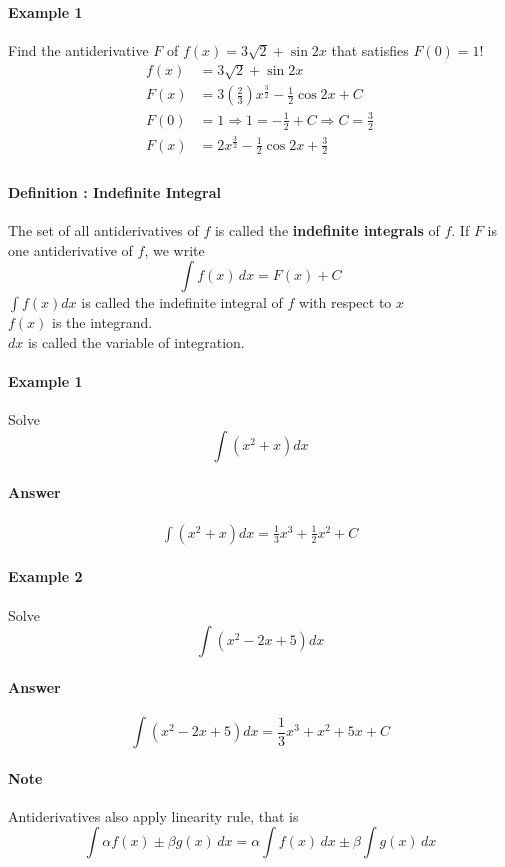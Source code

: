 \documentclass[12pt]{article}
\begin{document}
\paragraph{Example 1} Find the antiderivative $F$ of $f(x) = 3 \sqrt{2} + \sin 2x$ that satisfies $F(0) = 1$!
\begin{align*} 
    f(x) &= 3 \sqrt{2} + \sin 2x \\
    F(x) &= 3(\frac{2}{3}) x^{\frac{3}{2}} - \frac{1}{2} \cos 2x + C \\
    F(0) &= 1 \Rightarrow 1 = - \frac{1}{2} + C \Rightarrow C = \frac{3}{2} \\
    F(x) &= 2 x^{\frac{3}{2}} - \frac{1}{2} \cos 2x + \frac{3}{2} \\
\end{align*}

\paragraph{Definition : Indefinite Integral}
The set of all antiderivatives of $f$ is called the \textbf{indefinite integrals} of $f$. 
If $F$ is one antiderivative of $f$, we write
\[
    \int f(x) \, dx = F(x) + C
\]
\noindent
$\int f(x) dx$ is called the indefinite integral of $f$ with respect to $x$ \\
$f(x)$ is the integrand. \\
$dx$ is called the variable of integration.

\paragraph{Example 1} Solve
\[
    \int (x^2 + x) dx
\]
\paragraph{Answer}
\begin{align*} 
    \int (x^2 + x) dx = \frac{1}{3}x^3 + \frac{1}{2}x^2 + C
\end{align*}
\paragraph{Example 2} Solve
\[
    \int (x^2 - 2x + 5) dx 
\]
\paragraph{Answer}
\[
    \int (x^2 - 2x + 5) dx =  \frac{1}{3}x^3 + x^2 + 5x +  C
\]

\paragraph{Note} Antiderivatives also apply linearity rule, that is
\[
    \int \alpha f(x) \pm \beta g(x) \, dx = \alpha \int f(x) \, dx \pm \beta \int g(x) \, dx
\]
\end{document}
